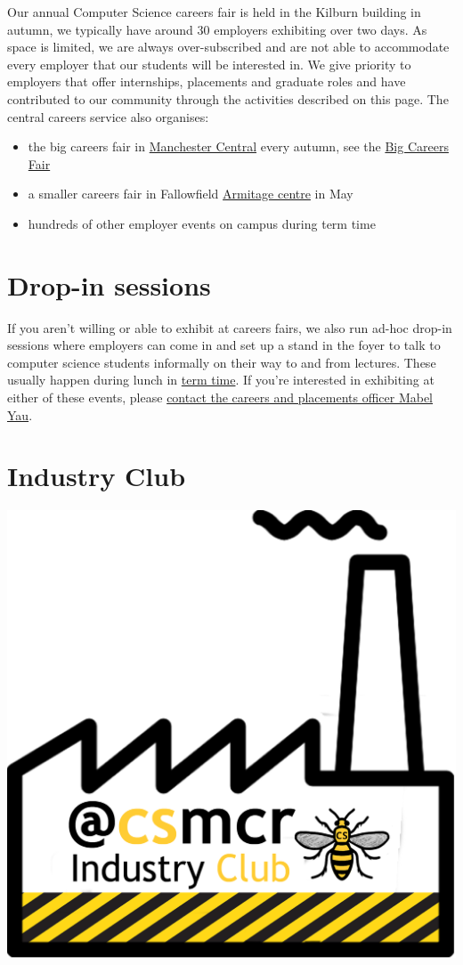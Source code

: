 \documentclass[
  12pt,
]{book}
\providecommand{\tightlist}{%
  \setlength{\itemsep}{0pt}\setlength{\parskip}{0pt}}
\begin{document}
Our annual Computer Science careers fair is held in the Kilburn building in autumn, we typically have around 30 employers exhibiting over two days. As space is limited, we are always over-subscribed and are not able to accommodate every employer that our students will be interested in. We give priority to employers that offer internships, placements and graduate roles and have contributed to our community through the activities described on this page. The central careers service also organises:

\begin{itemize}
\tightlist
\item
  the big careers fair in \href{https://www.manchestercentral.co.uk/}{Manchester Central} every autumn, see the \href{http://www.careers.manchester.ac.uk/events/bigcareersfair/}{Big Careers Fair}
\item
  a smaller careers fair in Fallowfield \href{http://www.sport.manchester.ac.uk/facilities/armitage/}{Armitage centre} in May
\item
  hundreds of other employer events on campus during term time \citep{highfliers2020}
\end{itemize}

\hypertarget{dropins}{%
\section{Drop-in sessions}\label{dropins}}

If you aren't willing or able to exhibit at careers fairs, we also run ad-hoc drop-in sessions where employers can come in and set up a stand in the foyer to talk to computer science students informally on their way to and from lectures. These usually happen during lunch in \href{https://www.manchester.ac.uk/discover/key-dates/}{term time}. If you're interested in exhibiting at either of these events, please \protect\hyperlink{Contact}{contact the careers and placements officer Mabel Yau}.

\hypertarget{industryclub}{%
\section{Industry Club}\label{industryclub}}

\begin{center}\includegraphics[width=0.4\linewidth]{images/industry-club-black} \end{center}
\end{document}
